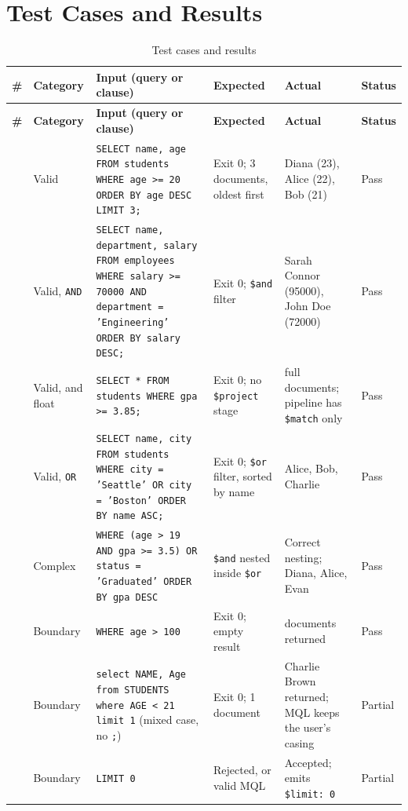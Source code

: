 \documentclass[12pt,a4paper]{report}
\newcommand{\codeus}{\textunderscore\allowbreak}
\DeclareRobustCommand{\code}[1]{\texttt{\let\_\codeus #1}}
\begin{document}
\section{Test Cases and Results}
{\footnotesize
\setlength{\tabcolsep}{3.5pt}
\begin{longtable}{|>{\raggedright\arraybackslash}p{0.45cm}|>{\raggedright\arraybackslash}p{1.75cm}|>{\raggedright\arraybackslash}p{4.9cm}|>{\raggedright\arraybackslash}p{2.4cm}|>{\raggedright\arraybackslash}p{3.2cm}|>{\raggedright\arraybackslash}p{1.1cm}|}
\caption{Test cases and results}\\
\hline
\textbf{\#} & \textbf{Category} & \textbf{Input (query or clause)} & \textbf{Expected} & \textbf{Actual} & \textbf{Status} \\ \hline
\endfirsthead
\hline
\textbf{\#} & \textbf{Category} & \textbf{Input (query or clause)} & \textbf{Expected} & \textbf{Actual} & \textbf{Status} \\ \hline
\endhead
1 & Valid & \code{SELECT name, age FROM students WHERE age >= 20 ORDER BY age DESC LIMIT 3;} & Exit 0; 3 documents, oldest first & Diana (23), Alice (22), Bob (21) & Pass \\ \hline
2 & Valid, \code{AND} & \code{SELECT name, department, salary FROM employees WHERE salary >= 70000 AND department = 'Engineering' ORDER BY salary DESC;} & Exit 0; \code{\$and} filter & Sarah Connor (95000), John Doe (72000) & Pass \\ \hline
3 & Valid, \code{*} and float & \code{SELECT * FROM students WHERE gpa >= 3.85;} & Exit 0; no \code{\$project} stage & 3 full documents; pipeline has \code{\$match} only & Pass \\ \hline
4 & Valid, \code{OR} & \code{SELECT name, city FROM students WHERE city = 'Seattle' OR city = 'Boston' ORDER BY name ASC;} & Exit 0; \code{\$or} filter, sorted by name & Alice, Bob, Charlie & Pass \\ \hline
5 & Complex & \code{WHERE (age > 19 AND gpa >= 3.5) OR status = 'Graduated' ORDER BY gpa DESC} & \code{\$and} nested inside \code{\$or} & Correct nesting; Diana, Alice, Evan & Pass \\ \hline
6 & Boundary & \code{WHERE age > 100} & Exit 0; empty result & 0 documents returned & Pass \\ \hline
7 & Boundary & \code{select NAME, Age from STUDENTS where AGE < 21 limit 1} (mixed case, no \code{;}) & Exit 0; 1 document & Charlie Brown returned; MQL keeps the user's casing & Partial \\ \hline
8 & Boundary & \code{LIMIT 0} & Rejected, or valid MQL & Accepted; emits \code{\$limit: 0} & Partial \\ \hline

\end{longtable}}
\end{document}
